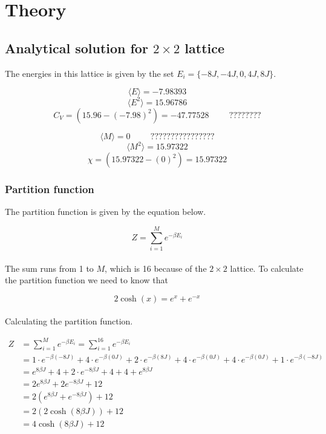 \documentclass{article}
\begin{document}
\vspace{1cm}

\section{Theory} \label{sec:Theory}

\subsection{Analytical solution for \texorpdfstring{ $2 \times 2$ }{text} lattice}

The energies in this lattice is given by the set $E_i = \{- 8 J, -4J, 0 , 4J, 8J \}$.

$$ \langle E \rangle = - 7.98393 $$
$$ \langle E^2 \rangle = 15.96786 $$
$$ C_V = (15.96 - (-7.98)^2) = -47.77528 \hspace{1cm} ???????? $$

$$ \langle M \rangle = 0 \hspace{1cm} ???????????????? $$
$$ \langle M^2 \rangle = 15.97322$$
$$ \chi = (15.97322 - (0)^2) = 15.97322 $$


\subsubsection{Partition function}

The partition function is given by the equation below.

\begin{equation} \label{eq:partitionfunction}
    Z = \sum_{i=1} ^{M} e^{- \beta E_i}
\end{equation} \\

The sum runs from 1 to $M$, which is 16 because of the $ 2 \times 2 $ lattice. To calculate the partition function we need to know that

\begin{equation*}
    2 \cosh (x) = e^x + e^{-x}
\end{equation*} \\

Calculating the partition function.

\begin{align*}
  Z &= \sum_{i=1} ^{M} e^{- \beta E_i} = \sum_{i=1} ^{16} e^{- \beta E_i} \\
  &= 1 \cdot e^{- \beta (-8J)} + 4 \cdot e^{- \beta (0J)} + 2 \cdot e^{- \beta (8J)} + 4 \cdot e^{- \beta (0J)}
  + 4 \cdot e^{- \beta (0J)} + 1 \cdot e^{- \beta (-8J)} \\
  &= e^{8 \beta J} + 4 + 2 \cdot e^{-8 \beta J} + 4 + 4 + e^{8 \beta J} \\
  &= 2 e^{8 \beta J } + 2 e^{-8 \beta J} + 12 \\
  &= 2 \left( e^{8 \beta J} + e^{- 8 \beta J} \right) + 12 \\
  &= 2 \left( 2 \cosh(8 \beta J) \right) + 12 \\
  &= 4 \cosh(8 \beta J) + 12
\end{align*} \\
\end{document}
